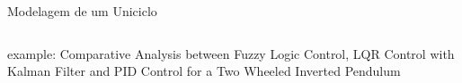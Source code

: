 \documentclass{beamer}
\begin{document}
\begin{frame}[c]{Modelagem de um Uniciclo}
\begin{columns}
\begin{column}[c]{0.6\textwidth}
        \end{column}
    \end{columns}
    example: Comparative Analysis between Fuzzy Logic
    Control, LQR Control with Kalman Filter and PID
    Control for a Two Wheeled Inverted Pendulum
\end{frame}



\end{document}
